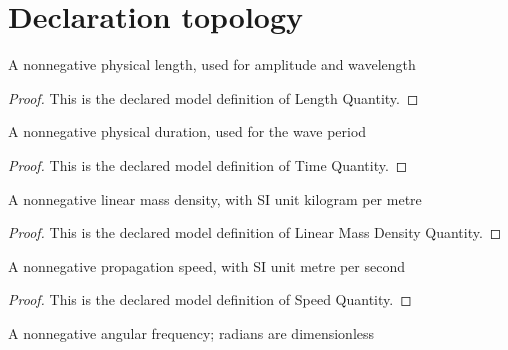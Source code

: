 \section{Declaration topology}
\begin{definition}
  \label{def:physics:phyx-mini-0293:phyxminiproblems-problemphyxmini0293-lengthquantity}
  A nonnegative physical length, used for amplitude and wavelength
\end{definition}
\begin{proof}
  This is the declared model definition of Length Quantity.
\end{proof}
\begin{definition}
  \label{def:physics:phyx-mini-0293:phyxminiproblems-problemphyxmini0293-timequantity}
  A nonnegative physical duration, used for the wave period
\end{definition}
\begin{proof}
  This is the declared model definition of Time Quantity.
\end{proof}
\begin{definition}
  \label{def:physics:phyx-mini-0293:phyxminiproblems-problemphyxmini0293-linearmassdensityquantity}
  A nonnegative linear mass density, with SI unit kilogram per metre
\end{definition}
\begin{proof}
  This is the declared model definition of Linear Mass Density Quantity.
\end{proof}
\begin{definition}
  \label{def:physics:phyx-mini-0293:phyxminiproblems-problemphyxmini0293-speedquantity}
  A nonnegative propagation speed, with SI unit metre per second
\end{definition}
\begin{proof}
  This is the declared model definition of Speed Quantity.
\end{proof}
\begin{definition}
  \label{def:physics:phyx-mini-0293:phyxminiproblems-problemphyxmini0293-angularfrequencyquantity}
  A nonnegative angular frequency; radians are dimensionless
\end{definition}
